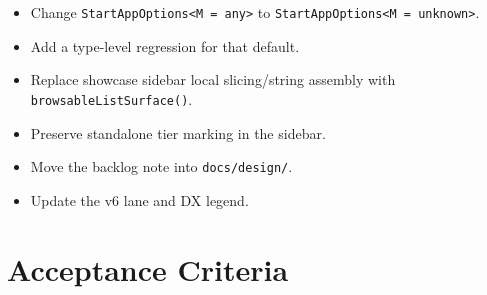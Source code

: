 \begin{itemize}
\tightlist
\item
  Change \texttt{S\allowbreak{}t\allowbreak{}a\allowbreak{}r\allowbreak{}t\allowbreak{}A\allowbreak{}p\allowbreak{}p\allowbreak{}O\allowbreak{}p\allowbreak{}t\allowbreak{}i\allowbreak{}o\allowbreak{}n\allowbreak{}s\allowbreak{}<\allowbreak{}M\allowbreak{} \allowbreak{}=\allowbreak{} \allowbreak{}a\allowbreak{}n\allowbreak{}y\allowbreak{}>} to \texttt{S\allowbreak{}t\allowbreak{}a\allowbreak{}r\allowbreak{}t\allowbreak{}A\allowbreak{}p\allowbreak{}p\allowbreak{}O\allowbreak{}p\allowbreak{}t\allowbreak{}i\allowbreak{}o\allowbreak{}n\allowbreak{}s\allowbreak{}<\allowbreak{}M\allowbreak{} \allowbreak{}=\allowbreak{} \allowbreak{}u\allowbreak{}n\allowbreak{}k\allowbreak{}n\allowbreak{}o\allowbreak{}w\allowbreak{}n\allowbreak{}>}.
\item
  Add a type-level regression for that default.
\item
  Replace showcase sidebar local slicing/string assembly with \texttt{b\allowbreak{}r\allowbreak{}o\allowbreak{}w\allowbreak{}s\allowbreak{}a\allowbreak{}b\allowbreak{}l\allowbreak{}e\allowbreak{}L\allowbreak{}i\allowbreak{}s\allowbreak{}t\allowbreak{}S\allowbreak{}u\allowbreak{}r\allowbreak{}f\allowbreak{}a\allowbreak{}c\allowbreak{}e\allowbreak{}(\allowbreak{})}.
\item
  Preserve standalone tier marking in the sidebar.
\item
  Move the backlog note into \texttt{d\allowbreak{}o\allowbreak{}c\allowbreak{}s\allowbreak{}/\allowbreak{}d\allowbreak{}e\allowbreak{}s\allowbreak{}i\allowbreak{}g\allowbreak{}n\allowbreak{}/}.
\item
  Update the v6 lane and DX legend.
\end{itemize}

\section{Acceptance Criteria}\label{record-131-acceptance-criteria}


